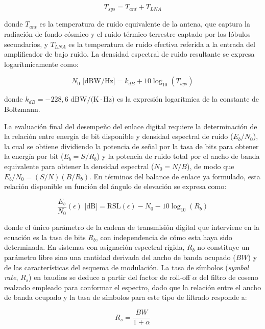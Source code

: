 \begin{equation}
    T_{sys} = T_{ant} + T_{LNA}
    \label{eq:tsys}
\end{equation}

donde $T_{ant}$ es la temperatura de ruido equivalente de la antena, que captura la radiación de fondo cósmico y el ruido térmico terrestre captado por los lóbulos secundarios, y $T_{LNA}$ es la temperatura de ruido efectiva referida a la entrada del amplificador de bajo ruido. La densidad espectral de ruido resultante se expresa logarítmicamente como:

\begin{equation}
    N_0 \text{ [dBW/Hz]} = k_{dB} + 10 \log_{10}(T_{sys})
    \label{eq:n0_log}
\end{equation}

donde $k_{dB} = -228{,}6 \text{ dBW/(K}\cdot\text{Hz)}$ es la expresión logarítmica de la constante de Boltzmann.

La evaluación final del desempeño del enlace digital requiere la determinación de la relación entre energía de bit disponible y densidad espectral de ruido ($E_b/N_0$), la cual se obtiene dividiendo la potencia de señal por la tasa de bits para obtener la energía por bit ($E_b = S/R_b$) y la potencia de ruido total por el ancho de banda equivalente para obtener la densidad espectral ($N_0 = N/B$), de modo que $E_b/N_0 = (S/N)(B/R_b)$. En términos del balance de enlace ya formulado, esta relación disponible en función del ángulo de elevación se expresa como:

\begin{equation}
    \frac{E_b}{N_0}(\epsilon) \text{ [dB]} = \text{RSL}(\epsilon) - N_0 - 10\log_{10}(R_b)
    \label{eq:ebn0_rb}
\end{equation}

donde el único parámetro de la cadena de transmisión digital que interviene en la ecuación es la tasa de bits $R_b$, con independencia de cómo esta haya sido determinada. En sistemas con asignación espectral rígida, $R_b$ no constituye un parámetro libre sino una cantidad derivada del ancho de banda ocupado ($BW$) y de las características del esquema de modulación. La tasa de símbolos (\textit{symbol rate}, $R_s$) en baudios se deduce a partir del factor de roll-off $\alpha$ del filtro de coseno realzado empleado para conformar el espectro, dado que la relación entre el ancho de banda ocupado y la tasa de símbolos para este tipo de filtrado responde a:

\begin{equation}
    R_s = \frac{BW}{1 + \alpha}
    \label{eq:rs_bw}
\end{equation}

